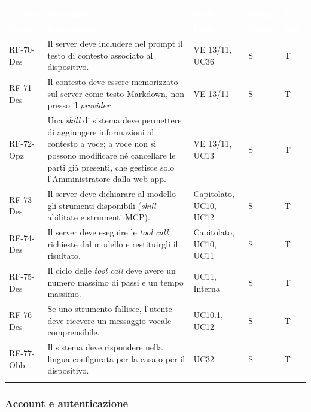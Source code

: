 \documentclass[12pt,a4paper]{article}
\newcommand{\thc}[1]{\textcolor{white}{\textbf{#1}}}
\newcommand{\rl}{\\ \arrayrulecolor{bfline}\hline}
\begin{document}
\begin{longtable}{>{\raggedright\arraybackslash}p{}>{\raggedright\arraybackslash}p{}>{\raggedright\arraybackslash}p{}>{\raggedright\arraybackslash}p{}>{\centering\arraybackslash}p{}}
\rowcolor{bfblue}\thc{Codice} & \thc{Descrizione} & \thc{Fonti} & \thc{Comp.} & \thc{Ver.} \\
\endfirsthead
\rowcolor{bfblue}\thc{Codice} & \thc{Descrizione} & \thc{Fonti} & \thc{Comp.} & \thc{Ver.} \\
\endhead
RF-70-Des & Il server deve includere nel prompt il testo di contesto associato al dispositivo. & VE 13/11, UC36 & S & T \rl
RF-71-Des & Il contesto deve essere memorizzato sul server come testo Markdown, non presso il \emph{provider}. & VE 13/11 & S & T \rl
RF-72-Opz & Una \emph{skill} di sistema deve permettere di aggiungere informazioni al contesto a voce; a voce non si possono modificare né cancellare le parti già presenti, che gestisce solo l'Amministratore dalla web app. & VE 13/11, UC13 & S & T \rl
RF-73-Des & Il server deve dichiarare al modello gli strumenti disponibili (\emph{skill} abilitate e strumenti MCP). & Capitolato, UC10, UC12 & S & T \rl
RF-74-Des & Il server deve eseguire le \emph{tool call} richieste dal modello e restituirgli il risultato. & Capitolato, UC10, UC11 & S & T \rl
RF-75-Des & Il ciclo delle \emph{tool call} deve avere un numero massimo di passi e un tempo massimo. & UC11, Interna & S & T \rl
RF-76-Des & Se uno strumento fallisce, l'utente deve ricevere un messaggio vocale comprensibile. & UC10.1, UC12 & S & T \rl
RF-77-Obb & Il sistema deve rispondere nella lingua configurata per la casa o per il dispositivo. & UC32 & S & T \rl
\end{longtable}

\subsubsection{Account e autenticazione}
\end{document}
